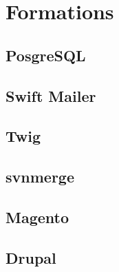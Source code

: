 \section{Formations}

\subsection{PosgreSQL}

\subsection{Swift Mailer}

\subsection{Twig}

\subsection{svnmerge}

\subsection{Magento}

\subsection{Drupal}